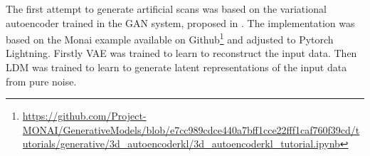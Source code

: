 The first attempt to generate artificial scans was based on the variational autoencoder trained in the GAN system, proposed in \cite{rombach2022high}. The implementation was based on the Monai\cite{Cardoso_MONAI_An_open-source_2022} example available on Github\footnote{\url{https://github.com/Project-MONAI/GenerativeModels/blob/e7cc989cdce440a7bff1cce22fff1caf760f39cd/tutorials/generative/3d_autoencoderkl/3d_autoencoderkl_tutorial.ipynb}} and adjusted to Pytorch Lightning. Firstly VAE was trained to learn to reconstruct the input data. Then LDM was trained to learn to generate latent representations of the input data from pure noise.



% 


